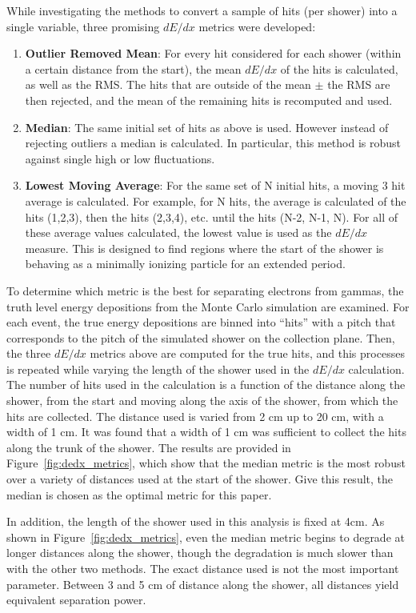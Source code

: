 While investigating the methods to convert a sample of hits (per shower) into a single variable, three promising $dE/dx$ metrics were developed:
\begin{enumerate}
  \item {\bf Outlier Removed Mean}: For every hit considered for each shower (within a certain distance from the start), the mean $dE/dx$ of the hits is calculated, as well as the RMS.  The hits that are outside of the mean $\pm$ the RMS are then rejected, and the mean of the remaining hits is recomputed and used.
  \item {\bf Median}: The same initial set of hits as above is used.  However instead of rejecting outliers a median is calculated.  In particular, this method is robust against single high or low fluctuations.
  \item {\bf Lowest Moving Average}: For the same set of N initial hits, a moving 3 hit average is calculated.  For example, for N hits, the average is calculated of the hits (1,2,3), then the hits (2,3,4), etc. until the hits (N-2, N-1, N).  For all of these average values calculated, the lowest value is used as the $dE/dx$ measure.  This is designed to find regions where the start of the shower is behaving as a minimally ionizing particle for an extended period.
\end{enumerate}

To determine which metric is the best for separating electrons from gammas, the truth level energy depositions from the Monte Carlo simulation are examined.  For each event, the true energy depositions are binned into ``hits'' with a pitch that corresponds to the pitch of the simulated shower on the collection plane.  Then, the three $dE/dx$ metrics above are computed for the true hits, and this processes is repeated while varying the length of the shower used in the $dE/dx$ calculation.  The number of hits used in the calculation is a function of the distance along the shower, from the start and moving along the axis of the shower, from which the hits are collected.  The distance used is varied from 2 cm up to 20 cm, with a width of 1 cm.  It was found that a width of 1 cm was sufficient to collect the hits along the trunk of the shower.  The results are provided in Figure~\ref{fig:dedx_metrics}, which show that the median metric is the most robust over a variety of distances used at the start of the shower.  Give this result, the median is chosen as the optimal metric for this paper.

In addition, the length of the shower used in this analysis is fixed at 4cm.  As shown in Figure~\ref{fig:dedx_metrics}, even the median metric begins to degrade at longer distances along the shower, though the degradation is much slower than with the other two methods.  The exact distance used is not the most important parameter.  Between 3 and 5 cm of distance along the shower, all distances yield equivalent separation power.

